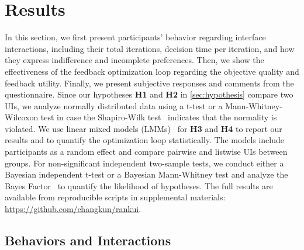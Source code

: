 \documentclass[acmsmall,screen,nonacm]{acmart}
\begin{document}
\section{Results}
In this section, we first present participants' behavior regarding interface interactions, including their total iterations, decision time per iteration, and how they express indifference and incomplete preferences.
%
Then, we show the effectiveness of the feedback optimization loop regarding the objective quality and feedback utility. Finally, we present subjective responses and comments from the questionnaire.
%
Since our hypotheses \textbf{H1} and \textbf{H2} in \autoref{sec:hypothesis} compare two UIs, we analyze normally distributed data using a t-test or a Mann-Whitney-Wilcoxon test in case the Shapiro-Wilk test~\cite{razali2011power} indicates that the normality is violated.
We use linear mixed models (LMMs)~\cite{bates2014fitting, kuznetsova2017lmertest} for \textbf{H3} and \textbf{H4} to report our results and to quantify the optimization loop statistically. The models include participants as a random effect and compare pairwise and listwise UIs between groups.
%
For non-significant independent two-sample tests, we conduct either a Bayesian independent t-test or a Bayesian Mann-Whitney test and analyze the Bayes Factor~\cite{wagenmakers2007bf, rouder2009bayesian} to quantify the likelihood of hypotheses.
%
The full results are available from reproducible scripts in supplemental materials: \url{https://github.com/changkun/rankui}.

\subsection{Behaviors and Interactions}
\end{document}
